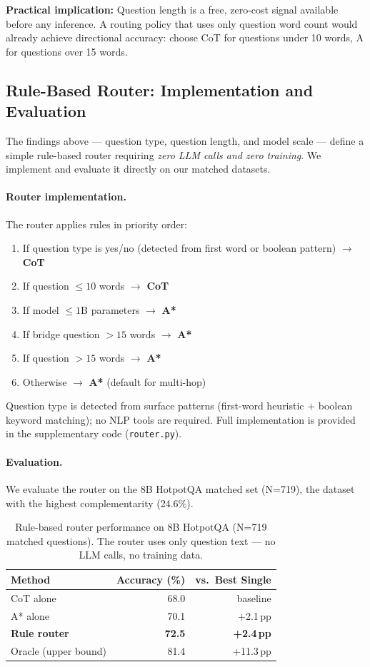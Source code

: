 \documentclass{article}
\begin{document}
\textbf{Practical implication:} Question length is a free, zero-cost signal available before any inference. A routing policy that uses only question word count would already achieve directional accuracy: choose CoT for questions under 10 words, A\* for questions over 15 words.

\subsection{Rule-Based Router: Implementation and Evaluation}
\label{sec:router}

The findings above --- question type, question length, and model scale --- define a simple rule-based router requiring \emph{zero LLM calls and zero training}. We implement and evaluate it directly on our matched datasets.

\paragraph{Router implementation.}
The router applies rules in priority order:
\begin{enumerate}[leftmargin=*, noitemsep]
  \item If question type is yes/no (detected from first word or boolean pattern) $\to$ \textbf{CoT}
  \item If question $\leq 10$ words $\to$ \textbf{CoT}
  \item If model $\leq 1$B parameters $\to$ \textbf{A*}
  \item If bridge question $> 15$ words $\to$ \textbf{A*}
  \item If question $> 15$ words $\to$ \textbf{A*}
  \item Otherwise $\to$ \textbf{A*} (default for multi-hop)
\end{enumerate}
Question type is detected from surface patterns (first-word heuristic + boolean keyword matching); no NLP tools are required. Full implementation is provided in the supplementary code (\texttt{router.py}).

\paragraph{Evaluation.}
We evaluate the router on the 8B HotpotQA matched set (N=719), the dataset with the highest complementarity (24.6\%).

\begin{table}[h]
\centering
\caption{Rule-based router performance on 8B HotpotQA (N=719 matched questions). The router uses only question text --- no LLM calls, no training data.}
\label{tab:router}
\small
\begin{tabular}{lrr}
\toprule
Method & Accuracy (\%) & vs.\ Best Single \\
\midrule
CoT alone      & 68.0 & baseline \\
A* alone       & 70.1 & +2.1\,pp \\
\textbf{Rule router} & \textbf{72.5} & \textbf{+2.4\,pp} \\
Oracle (upper bound) & 81.4 & +11.3\,pp \\
\bottomrule
\end{tabular}
\end{table}
\end{document}
